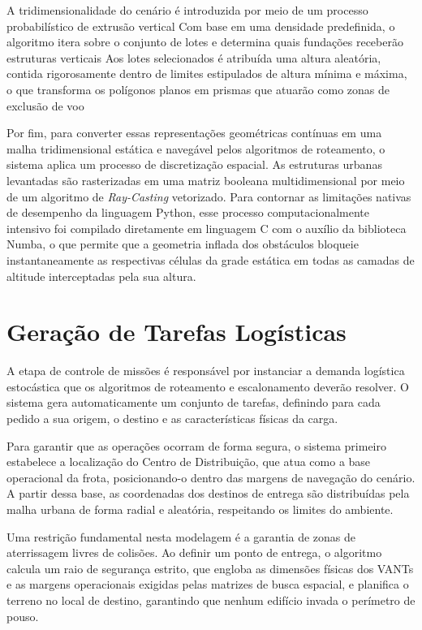 A tridimensionalidade do cenário é introduzida por meio de um processo probabilístico de extrusão vertical %
Com base em uma densidade predefinida, o algoritmo itera sobre o conjunto de lotes e determina quais fundações receberão estruturas verticais %
Aos lotes selecionados é atribuída uma altura aleatória, contida rigorosamente dentro de limites estipulados de altura mínima e máxima, o que transforma os polígonos planos em prismas que atuarão como zonas de exclusão de voo %

Por fim, para converter essas representações geométricas contínuas em uma malha tridimensional estática e navegável pelos algoritmos de roteamento, o sistema aplica um processo de discretização espacial. As estruturas urbanas levantadas são rasterizadas em uma matriz booleana multidimensional por meio de um algoritmo de \textit{Ray-Casting} vetorizado. Para contornar as limitações nativas de desempenho da linguagem Python, esse processo computacionalmente intensivo foi compilado diretamente em linguagem C com o auxílio da biblioteca Numba, o que permite que a geometria inflada dos obstáculos bloqueie instantaneamente as respectivas células da grade estática em todas as camadas de altitude interceptadas pela sua altura.

\section{Geração de Tarefas Logísticas}\label{sec:tarefas}

A etapa de controle de missões é responsável por instanciar a demanda logística estocástica que os algoritmos de roteamento e escalonamento deverão resolver. O sistema gera automaticamente um conjunto de tarefas, definindo para cada pedido a sua origem, o destino e as características físicas da carga.

Para garantir que as operações ocorram de forma segura, o sistema primeiro estabelece a localização do Centro de Distribuição, que atua como a base operacional da frota, posicionando-o dentro das margens de navegação do cenário. A partir dessa base, as coordenadas dos destinos de entrega são distribuídas pela malha urbana de forma radial e aleatória, respeitando os limites do ambiente.

Uma restrição fundamental nesta modelagem é a garantia de zonas de aterrissagem livres de colisões. Ao definir um ponto de entrega, o algoritmo calcula um raio de segurança estrito, que engloba as dimensões físicas dos VANTs e as margens operacionais exigidas pelas matrizes de busca espacial, e planifica o terreno no local de destino, garantindo que nenhum edifício invada o perímetro de pouso.

